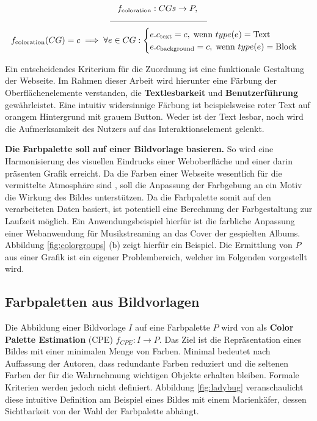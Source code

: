 \begin{equation}
\begin{gathered}
  f_\text{coloration}: CGs \to P,\; \\[-1mm] 
  \mathclap{\rule{4cm}{0.4pt}}\\
  f_\text{coloration}(CG) = c \implies \forall e \in CG:
  	\begin{cases}
		e.c_\text{text} = c, \; \text{wenn } type(e) = \text{Text} \\
		e.c_\text{background} = c, \; \text{wenn } type(e) = \text{Block}
	\end{cases}
\end{gathered}
\end{equation}

Ein entscheidendes Kriterium für die Zuordnung  ist eine funktionale Gestaltung der Webseite. Im Rahmen dieser Arbeit wird hierunter eine Färbung der Oberflächenelemente verstanden, die \textbf{Textlesbarkeit} und \textbf{Benutzerführung} gewährleistet. Eine intuitiv widersinnige Färbung ist beispielsweise roter Text auf orangem Hintergrund mit grauem Button. Weder ist der Text lesbar, noch wird die Aufmerksamkeit des Nutzers auf das Interaktionselement gelenkt.

\textbf{Die Farbpalette soll auf einer Bildvorlage basieren.} So wird eine Harmonisierung des visuellen Eindrucks einer Weboberfläche und einer darin präsenten Grafik erreicht. Da die Farben einer Webseite wesentlich für die vermittelte Atmosphäre sind \citep{webdesign}, soll die Anpassung der Farbgebung an ein Motiv die Wirkung des Bildes unterstützen. Da die Farbpalette somit auf den verarbeiteten Daten basiert, ist potentiell eine Berechnung der Farbgestaltung zur Laufzeit möglich. Ein Anwendungsbeispiel hierfür ist die farbliche Anpassung einer Webanwendung für Musikstreaming an das Cover der gespielten Albums. Abbildung \ref{fig:colorgroups} (b) zeigt hierfür ein Beispiel. Die Ermittlung von $P$ aus einer Grafik ist ein eigener Problembereich, welcher im Folgenden vorgestellt wird.

\subsection{Farbpaletten aus Bildvorlagen}
\label{sec:bildvorlagen}

Die Abbildung einer Bildvorlage $I$ auf eine Farbpalette $P$ wird von \citet{acopa} als \textbf{Color Palette Estimation} (CPE) $f_{CPE}: I \to P$. Das Ziel ist die Repräsentation eines Bildes mit einer minimalen Menge von Farben. \glqq{}Minimal\grqq{} bedeutet nach Auffassung der Autoren, dass redundante Farben reduziert und die seltenen Farben der für die Wahrnehmung wichtigen Objekte erhalten bleiben. Formale Kriterien werden jedoch nicht definiert. Abbildung \ref{fig:ladybug} veranschaulicht diese intuitive Definition am Beispiel eines Bildes mit einem Marienkäfer, dessen Sichtbarkeit von der Wahl der Farbpalette abhängt.

